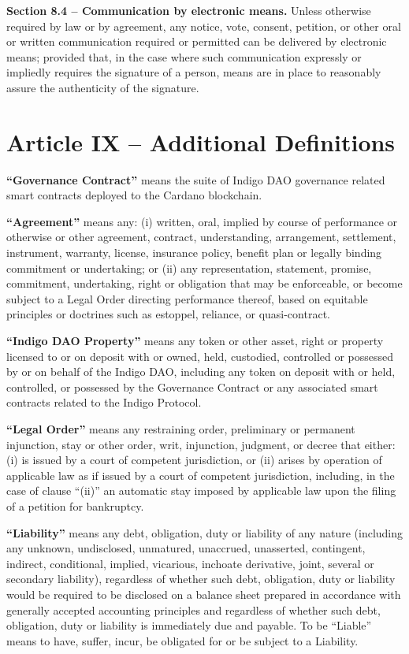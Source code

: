 \textbf{Section 8.4 -- Communication by electronic means.} Unless
otherwise required by law or by agreement, any notice, vote, consent,
petition, or other oral or written communication required or permitted
can be delivered by electronic means; provided that, in the case where
such communication expressly or impliedly requires the signature of a
person, means are in place to reasonably assure the authenticity of the
signature.

\hypertarget{article-ix-additional-definitions}{%
\section{Article IX -- Additional
Definitions}\label{article-ix-additional-definitions}}

\textbf{``Governance Contract''} means the suite of Indigo DAO
governance related smart contracts deployed to the Cardano blockchain.

\textbf{``Agreement''} means any: (i) written, oral, implied by course
of performance or otherwise or other agreement, contract, understanding,
arrangement, settlement, instrument, warranty, license, insurance
policy, benefit plan or legally binding commitment or undertaking; or
(ii) any representation, statement, promise, commitment, undertaking,
right or obligation that may be enforceable, or become subject to a
Legal Order directing performance thereof, based on equitable principles
or doctrines such as estoppel, reliance, or quasi-contract.

\textbf{``Indigo DAO Property''} means any token or other asset, right
or property licensed to or on deposit with or owned, held, custodied,
controlled or possessed by or on behalf of the Indigo DAO, including any
token on deposit with or held, controlled, or possessed by the
Governance Contract or any associated smart contracts related to the
Indigo Protocol.

\textbf{``Legal Order''} means any restraining order, preliminary or
permanent injunction, stay or other order, writ, injunction, judgment,
or decree that either: (i) is issued by a court of competent
jurisdiction, or (ii) arises by operation of applicable law as if issued
by a court of competent jurisdiction, including, in the case of clause
``(ii)'' an automatic stay imposed by applicable law upon the filing of
a petition for bankruptcy.

\textbf{``Liability''} means any debt, obligation, duty or liability of
any nature (including any unknown, undisclosed, unmatured, unaccrued,
unasserted, contingent, indirect, conditional, implied, vicarious,
inchoate derivative, joint, several or secondary liability), regardless
of whether such debt, obligation, duty or liability would be required to
be disclosed on a balance sheet prepared in accordance with generally
accepted accounting principles and regardless of whether such debt,
obligation, duty or liability is immediately due and payable. To be
``Liable'' means to have, suffer, incur, be obligated for or be subject
to a Liability.
